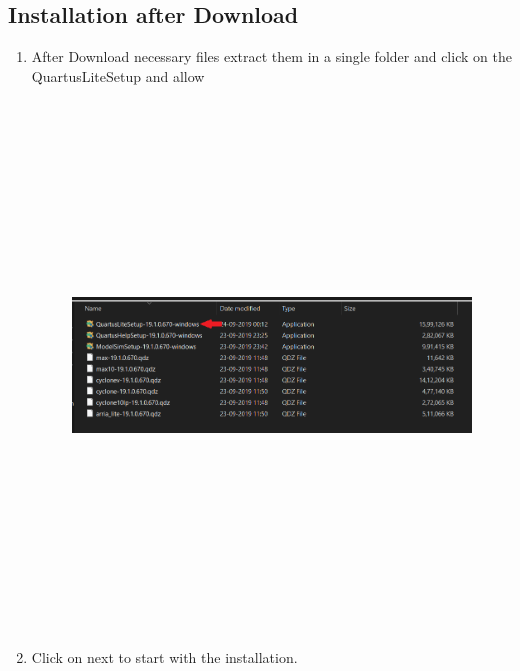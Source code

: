 \documentclass[12pt,singleside,a4paper]{article}
\begin{document}
\subsection{Installation after Download}
\begin{enumerate}
    \item After Download necessary files extract them in a single folder and click on the QuartusLiteSetup and allow 
    \begin{figure}[H]
        \centering
        \includegraphics[height = 14cm, width =14cm,keepaspectratio]{InstallationImages/Setup.png}
        \end{figure}
    \item Click on next to start with the installation.
    \begin{figure}[H]
        \centering

\end{figure}
\end{enumerate}
\end{document}
